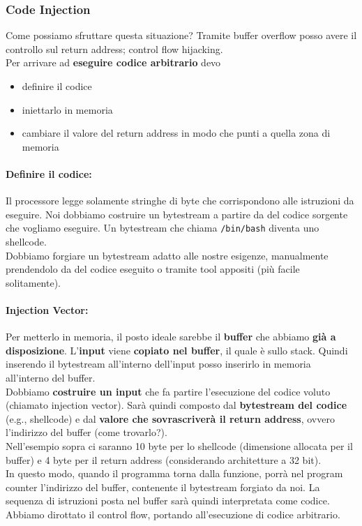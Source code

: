 \subsubsection{Code Injection}
Come possiamo sfruttare questa situazione? Tramite buffer overflow posso avere il controllo sul return address; control flow hijacking.\\

Per arrivare ad \textbf{eseguire codice arbitrario} devo
\begin{itemize}
	\item definire il codice
	\item iniettarlo in memoria
	\item cambiare il valore del return address in modo che punti a quella zona di memoria
\end{itemize}

\paragraph{Definire il codice:} Il processore legge solamente stringhe di byte che corrispondono alle istruzioni da eseguire. Noi dobbiamo costruire un bytestream a partire da del codice sorgente che vogliamo eseguire. Un bytestream che chiama \texttt{/bin/bash} diventa uno shellcode.\\
Dobbiamo forgiare un bytestream adatto alle nostre esigenze, manualmente prendendolo da del codice eseguito o tramite tool appositi (più facile solitamente).

\paragraph{Injection Vector:} Per metterlo in memoria, il posto ideale sarebbe il \textbf{buffer} che abbiamo \textbf{già a disposizione}. L'\textbf{input} viene \textbf{copiato nel buffer}, il quale è sullo stack. Quindi inserendo il bytestream all'interno dell'input posso inserirlo in memoria all'interno del buffer.\\

Dobbiamo \textbf{costruire un input} che fa partire l'esecuzione del codice voluto (chiamato injection vector). Sarà quindi composto dal \textbf{bytestream del codice} (e.g., shellcode) e dal \textbf{valore che sovrascriverà il return address}, ovvero l'indirizzo del buffer (come trovarlo?). \\
Nell'esempio sopra ci saranno 10 byte per lo shellcode (dimensione allocata per il buffer) e 4 byte per il return address (considerando architetture a 32 bit).\\
In questo modo, quando il programma torna dalla funzione, porrà nel program counter l'indirizzo del buffer, contenente il bytestream forgiato da noi. La sequenza di istruzioni posta nel buffer sarà quindi interpretata come codice. Abbiamo dirottato il control flow, portando all'esecuzione di codice arbitrario.\\

